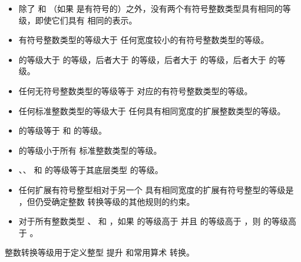 \begin{itemize}
\item 除了  和 （如果  是有符号的）之外，没有两个有符号整数类型具有相同的等级，即使它们具有
相同的表示。

\item 有符号整数类型的等级大于
任何宽度较小的有符号整数类型的等级。

\item {} 的等级大于
 的等级，后者大于
 的等级，后者大于
 的等级，后者大于
 的等级。

\item 任何无符号整数类型的等级等于
对应的有符号整数类型的等级。

\item 任何标准整数类型的等级大于
任何具有相同宽度的扩展整数类型的等级。

\item {} 的等级等于 
和  的等级。

\item {} 的等级小于所有
标准整数类型的等级。

\item
{}%
%
%
、、 和
 的等级等于其底层类型 的等级。

\item 任何扩展有符号整型相对于另一个
具有相同宽度的扩展有符号整型的等级是 ，但仍受确定整数
转换等级的其他规则的约束。

\item 对于所有整数类型 、 和 ，如果
 的等级高于  并且  的等级高于
，则  的等级高于
。
\end{itemize}

\begin{note}
整数转换等级用于定义整型
提升 和常用算术
转换。
\end{note}

